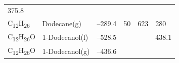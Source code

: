 \documentclass[
  9pt,
]{extbook}
\theoremstyle{definition}
\theoremstyle{definition}
\theoremstyle{definition}
\theoremstyle{remark}
\begin{document}
\begin{longtable}[]{@{}llllll@{}}
\begin{minipage}[t]{0.14\columnwidth}
375.8\strut
\end{minipage}\tabularnewline
\begin{minipage}[t]{0.07\columnwidth}\raggedright
C\textsubscript{12}H\textsubscript{26}\strut
\end{minipage} & \begin{minipage}[t]{0.17\columnwidth}\raggedright
Dodecane(g)\strut
\end{minipage} & \begin{minipage}[t]{0.15\columnwidth}\raggedright
--289.4\strut
\end{minipage} & \begin{minipage}[t]{0.15\columnwidth}\raggedright
50\strut
\end{minipage} & \begin{minipage}[t]{0.14\columnwidth}\raggedright
623\strut
\end{minipage} & \begin{minipage}[t]{0.14\columnwidth}\raggedright
280\strut
\end{minipage}\tabularnewline
\begin{minipage}[t]{0.07\columnwidth}\raggedright
C\textsubscript{12}H\textsubscript{26}O\strut
\end{minipage} & \begin{minipage}[t]{0.17\columnwidth}\raggedright
1-Dodecanol(l)\strut
\end{minipage} & \begin{minipage}[t]{0.15\columnwidth}\raggedright
--528.5\strut
\end{minipage} & \begin{minipage}[t]{0.15\columnwidth}\raggedright
\strut
\end{minipage} & \begin{minipage}[t]{0.14\columnwidth}\raggedright
\strut
\end{minipage} & \begin{minipage}[t]{0.14\columnwidth}\raggedright
438.1\strut
\end{minipage}\tabularnewline
\begin{minipage}[t]{0.07\columnwidth}\raggedright
C\textsubscript{12}H\textsubscript{26}O\strut
\end{minipage} & \begin{minipage}[t]{0.17\columnwidth}\raggedright
1-Dodecanol(g)\strut
\end{minipage} & \begin{minipage}[t]{0.15\columnwidth}\raggedright
--436.6\strut
\end{minipage} & \begin{minipage}[t]{0.15\columnwidth}\raggedright

\end{minipage}
\end{longtable}
\end{document}
